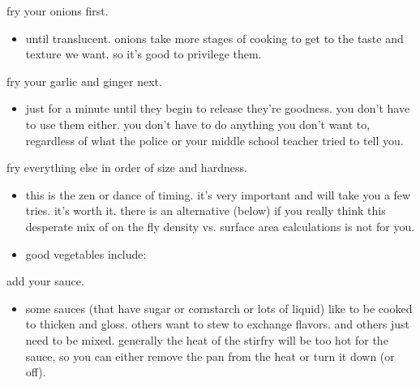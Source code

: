 \begin{algorithm}
  \item fry your onions first.
  \begin{itemize}
    \item until translucent. onions take more stages of cooking to get to the taste and texture we want. so it's good to privilege them.
  \end{itemize}
  
  \item fry your garlic and ginger next.
  \begin{itemize}
    \item just for a minute until they begin to release they're goodness. you don't have to use them either. you don't have to do anything you don't want to, regardless of what the police or your middle school teacher tried to tell you.
  \end{itemize}

  \item fry everything else in order of size and hardness.
  \begin{itemize}
    \item this is the zen or dance of timing. it's very important and will take you a few tries. it's worth it. there is an alternative (below) if you really think this desperate mix of on the fly density vs. surface area calculations is not for you.
    \item good vegetables include:
  \end{itemize}

  \item add your sauce.
  \begin{itemize}
    \item some sauces (that have sugar or cornstarch or lots of liquid) like to be cooked to thicken and gloss. others want to stew to exchange flavors. and others just need to be mixed. generally the heat of the stirfry will be too hot for the sauce, so you can either remove the pan from the heat or turn it down (or off).
  \end{itemize}

\end{algorithm}

